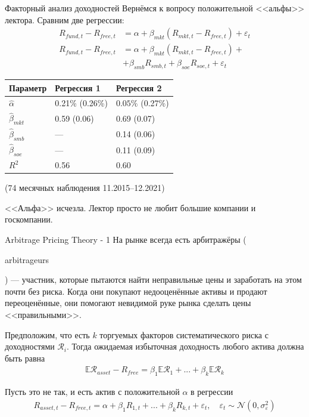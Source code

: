 \documentclass{beamer}
\newcommand{\en}[1]{\begin{otherlanguage}{english}#1\end{otherlanguage}}
\begin{document}
\begin{frame}{Факторный анализ доходностей}
\justify
Вернёмся к вопросу положительной <<альфы>> лектора. Сравним две регрессии:
\begin{align*}
R_{fund,t} - R_{free,t} &=
\alpha + \beta_{mkt}(R_{mkt,t} - R_{free,t}) + \varepsilon_t
\\
R_{fund,t} - R_{free,t} &=
\alpha + \beta_{mkt}(R_{mkt,t} - R_{free,t}) + \\
&+ \beta_{smb}R_{smb,t} + \beta_{soe}R_{soe,t} + \varepsilon_t
\end{align*}

\centering
\begin{tabular}{l|l|l}
Параметр            & Регрессия 1                   & Регрессия 2 \\ \hline
$\hat{\alpha}$      & 0.21\% {\scriptsize (0.26\%)} & $0.05\%$
{\scriptsize (0.27\%)} \\
$\hat{\beta}_{mkt}$ & 0.59 {\scriptsize (0.06)}     & 0.69
{\scriptsize (0.07)} \\
$\hat{\beta}_{smb}$ & ---                           & 0.14 \scriptsize{(0.06)} \\
$\hat{\beta}_{soe}$ & ---                           & 0.11
{\scriptsize (0.09)} \\
$R^2$               & 0.56                          & 0.60 \\ \hline
\end{tabular}

{\scriptsize (74 месячных наблюдения 11.2015--12.2021)}

\justify
<<Альфа>> исчезла. Лектор просто не любит большие компании и госкомпании.
\end{frame}



\begin{frame}{Arbitrage Pricing Theory - 1}
\justify
На рынке всегда есть арбитражёры (\en{arbitrageurs}) --- участник, которые 
пытаются найти неправильные цены и заработать на этом почти без риска. Когда
они покупают недооценённые активы и продают переоценённые, они помогают
невидимой руке рынка сделать цены <<правильными>>.

\justify
Предположим, что есть $k$ торгуемых факторов систематического риска с 
доходностями $\mathcal{R}_i$. Тогда ожидаемая избыточная доходность любого 
актива должна быть равна
\begin{align*}
\mathbb{E}\mathcal{R}_{asset} - R_{free} =
\beta_1\mathbb{E}\mathcal{R}_1 + ... + \beta_k\mathbb{E}\mathcal{R}_k
\end{align*}

\justify
Пусть это не так, и есть актив с положительной $\alpha$ в регрессии
\begin{align*}
R_{asset,t} - R_{free,t} =
\alpha + \beta_1R_{1,t} + ... + \beta_kR_{k,t} 
+ \varepsilon_t,\quad
\varepsilon_t \sim \mathcal{N}(0, \sigma_{\varepsilon}^2)
\end{align*}
\end{frame}
\end{document}
